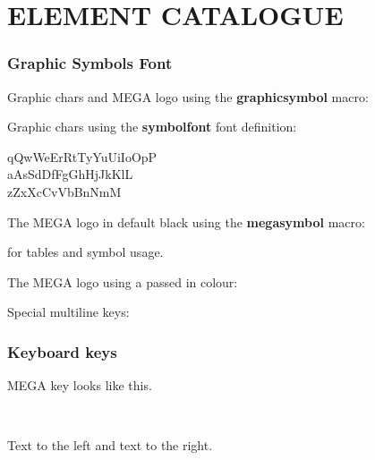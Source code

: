 %
%
%


\part{ELEMENT CATALOGUE}

\section{Graphic Symbols Font}

Graphic chars and MEGA logo using the {\bf graphicsymbol} macro:


Graphic chars using the {\bf symbolfont} font definition:

\begin{symbolfont}%
	qQwWeErRtTyYuUiIoOpP\\
	aAsSdDfFgGhHjJkKlL\\
	zZxXcCvVbBnNmM%
\end{symbolfont}%

The MEGA logo in default black using the {\bf megasymbol} macro:

\megasymbol for tables and symbol usage.

The MEGA logo using a passed in colour:

\megasymbol[black]
\megasymbol[brown]
\megasymbol[orange]
\megasymbol[blue]

Special multiline keys:
%
%
%
%
%
%
%

\section{Keyboard keys}

\megasymbolkey MEGA key looks like this.

\\

Text to the left  and text to the right.

    \megakey{ } 

